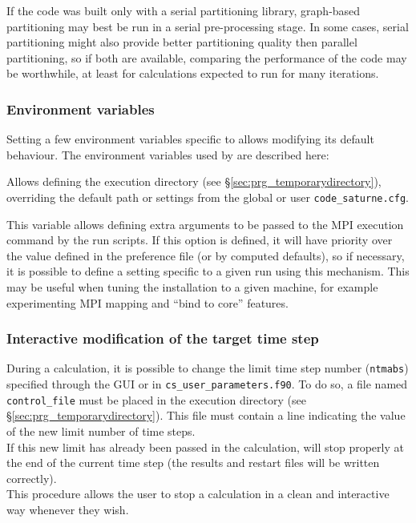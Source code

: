 {{{If the code was built only with a serial partitioning library,
graph-based partitioning may best be run in a serial pre-processing stage.
In some cases, serial partitioning might also provide better partitioning
quality then parallel partitioning, so if both are available, comparing
the performance of the code may be worthwhile, at least for calculations
expected to run for many iterations.

\subsubsection{Environment variables\label{sec:envcs}}

Setting a few environment variables specific to \CS allows modifying
its default behaviour. The environment variables used by \CS
are described here:


Allows defining the execution directory (see
\S\ref{sec:prg_temporarydirectory}),
overriding the default path or settings from the global
or user \texttt{code\_saturne.cfg}.


This variable allows defining extra arguments to be passed to
the MPI execution command by the run scripts.
If this option is defined, it will have priority over the value defined
in the preference file (or by computed defaults), so if necessary, it
is possible to define a setting specific to a given run using this
mechanism. This may be useful when tuning the installation to a given
machine, for example experimenting MPI mapping and ``bind to core''
features.

\subsubsection{Interactive modification of the target time step}
\label{sec:prg_control_file}%
During a calculation, it is possible to change the limit time step number
(\texttt{ntmabs}) specified through the GUI or in \texttt{cs\_user\_parameters.f90}.
To do so, a file named \texttt{control\_file} must be placed in the
execution directory (see \S\ref{sec:prg_temporarydirectory}).
This file must contain a line indicating the value of the new limit
number of time steps.\\
If this new limit has already been passed in the calculation, \CS will stop
properly at the end of the current time step (the results and restart files
will be written correctly).\\
This procedure allows the user to stop a calculation in a clean and interactive
way whenever they wish.

}}}
